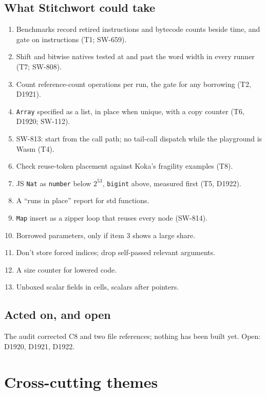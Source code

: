 \documentclass[11pt,a4paper]{article}
\newcommand{\code}[1]{\texttt{#1}}
\begin{document}
\subsection{What Stitchwort could take}
\begin{enumerate}
  \item Benchmarks record retired instructions and bytecode counts beside time, and gate on
        instructions (T1; SW-659).
  \item Shift and bitwise natives tested at and past the word width in every runner (T7;
        SW-808).
  \item Count reference-count operations per run, the gate for any borrowing (T2, D1921).
  \item \code{Array} specified as a list, in place when unique, with a copy counter (T6, D1920;
        SW-112).
  \item SW-813: start from the call path; no tail-call dispatch while the playground is Wasm
        (T4).
  \item Check reuse-token placement against Koka's fragility examples (T8).
  \item JS \code{Nat} as \code{number} below $2^{53}$, \code{bigint} above, measured first (T5,
        D1922).
  \item A ``runs in place'' report for std functions.
  \item \code{Map} insert as a zipper loop that reuses every node (SW-814).
  \item Borrowed parameters, only if item 3 shows a large share.
  \item Don't store forced indices; drop self-passed relevant arguments.
  \item A size counter for lowered code.
  \item Unboxed scalar fields in cells, scalars after pointers.
\end{enumerate}

\subsection{Acted on, and open}
The audit corrected C8 and two file references; nothing has been built yet. Open: D1920, D1921,
D1922.

\section{Cross-cutting themes}\label{sec:themes}
\end{document}
